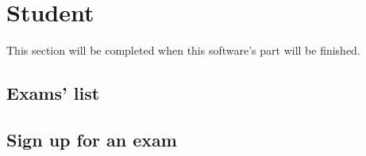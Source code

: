 \documentclass[ManualeUtente.tex]{subfiles}
\begin{document}
\chapter{Student}
This section will be completed when this software's part will be finished.
\section{Exams' list}
\section{Sign up for an exam}
\end{document}
